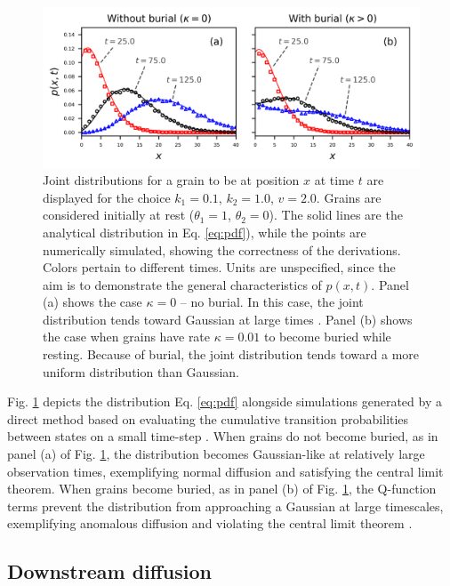 \begin{figure}[!htbp]
	\includegraphics[width=\linewidth,keepaspectratio]{./figures/ch4/pdf-plot.png}
	\caption{Joint distributions for a grain to be at position $x$ at time $t$ are displayed for the choice $k_1=0.1$, $k_2=1.0$, $v=2.0$. Grains are considered initially at rest ($\theta_1=1$, $\theta_2=0$). The solid lines are the analytical distribution in Eq. \ref{eq:pdf}), while the points are numerically simulated, showing the correctness of the derivations. Colors pertain to different times. Units are unspecified, since the aim is to demonstrate the general characteristics of $p(x,t)$. Panel (a) shows the case $\kappa=0$ -- no burial. In this case, the joint distribution tends toward Gaussian at large times \citep{Einstein1937,Lisle1998}. Panel (b) shows the case when grains have rate $\kappa = 0.01$ to become buried while resting. Because of burial, the joint distribution tends toward a more uniform distribution than Gaussian.
		\label{fig:diffpdfs}}
\end{figure}

Fig. \ref{fig:diffpdfs} depicts the distribution Eq. \ref{eq:pdf} alongside simulations generated by a direct method based on evaluating the cumulative transition probabilities between states on a small time-step \citep{Barik2006}.
When grains do not become buried, as in panel (a) of Fig. \ref{fig:diffpdfs}, the distribution becomes Gaussian-like at relatively large observation times, exemplifying normal diffusion and satisfying the central limit theorem.
When grains become buried, as in panel (b) of Fig. \ref{fig:diffpdfs},  the Q-function terms prevent the distribution from approaching a Gaussian at large timescales, exemplifying anomalous diffusion \citep{Weeks1998} and violating the central limit theorem \citep{Metzler2000,Schumer2009}.


\subsection{Downstream diffusion}

